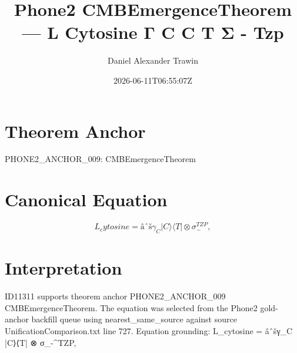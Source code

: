 \documentclass[11pt]{article}
\title{Phone2 CMBEmergenceTheorem — L Cytosine Γ C C T Σ - Tzp}
\author{Daniel Alexander Trawin}
\date{2026-06-11T06:55:07Z}
\begin{document}
\maketitle
\section*{Theorem Anchor}
PHONE2_ANCHOR_009: CMBEmergenceTheorem
\section*{Canonical Equation}
\[
L_cytosine = âˆšγ_C |C⟩⟨T| ⊗ σ_-^{TZP},
\]
\section*{Interpretation}
ID11311 supports theorem anchor PHONE2_ANCHOR_009 CMBEmergenceTheorem. The equation was selected from the Phone2 gold-anchor backfill queue using nearest_same_source against source UnificationComparison.txt line 727. Equation grounding: L_cytosine = âˆšγ_C |C⟩⟨T| ⊗ σ_-^{TZP},
\end{document}
